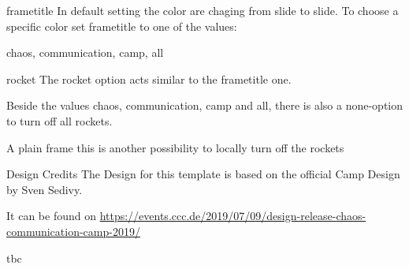 \documentclass[aspectratio=169,t]{beamer}
\begin{document}
\begin{frame}{frametitle}
In default setting the color are chaging from slide to slide. 
To choose a specific color set frametitle to one of the values:

chaos, communication, camp, all
\end{frame}

\begin{frame}{rocket}
The rocket option acts similar to the frametitle one. 

Beside the values chaos, communication, camp and all, there is also a none-option to turn off all rockets.
\end{frame}

\begin{frame}[plain]{A plain frame}
this is another possibility to locally turn off the rockets
\end{frame}




\begin{frame}{Design Credits}
The Design for this template is based on the official Camp Design by Sven Sedivy.

It can be found on \url{https://events.ccc.de/2019/07/09/design-release-chaos-communication-camp-2019/}
\end{frame}

\begin{frame}
	tbc
\end{frame}
\end{document}
